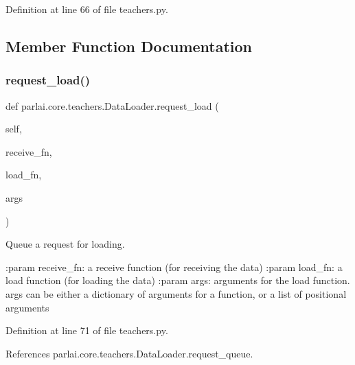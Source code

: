 Definition at line 66 of file teachers.\+py.



\subsection{Member Function Documentation}
\mbox{\label{classparlai_1_1core_1_1teachers_1_1DataLoader_a06bfd397f84fd1e2d0d64d64182ae5f5}} 
\subsubsection{\texorpdfstring{request\+\_\+load()}{request\_load()}}
{\footnotesize\ttfamily def parlai.\+core.\+teachers.\+Data\+Loader.\+request\+\_\+load (\begin{DoxyParamCaption}\item[{}]{self,  }\item[{}]{receive\+\_\+fn,  }\item[{}]{load\+\_\+fn,  }\item[{}]{args }\end{DoxyParamCaption})}

\begin{DoxyVerb}Queue a request for loading.

:param receive_fn:
    a receive function (for receiving the data)
:param load_fn:
    a load function (for loading the data)
:param args:
    arguments for the load function. args can be either a dictionary of
    arguments for a function, or a list of positional arguments
\end{DoxyVerb}
 

Definition at line 71 of file teachers.\+py.



References parlai.\+core.\+teachers.\+Data\+Loader.\+request\+\_\+queue.

\mbox{\label{classparlai_1_1core_1_1teachers_1_1DataLoader_a2663781dd1e8cc85535e3cb075fbb8b7}} 

